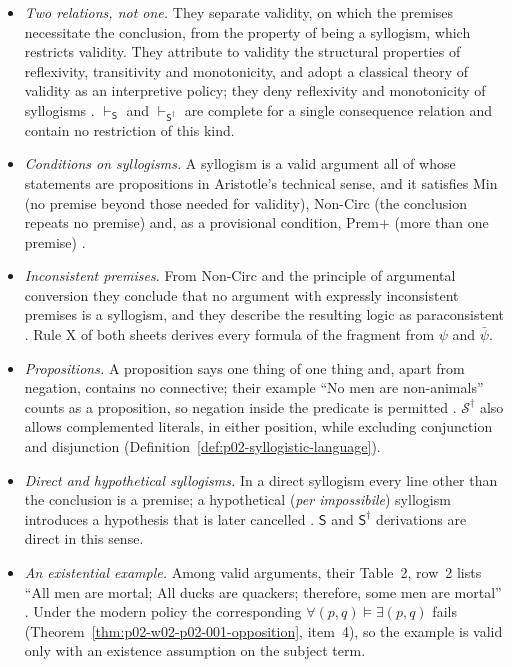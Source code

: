 \begin{itemize}
\item \emph{Two relations, not one.} They separate validity, on which the
 premises necessitate the conclusion, from the property of being a
 syllogism, which restricts validity. They attribute to validity the
 structural properties of reflexivity, transitivity and monotonicity, and
 adopt a classical theory of validity as an interpretive policy; they deny
 reflexivity and monotonicity of syllogisms
 \cite[pp.~49--51, 59]{WoodsIrvine2004EarlyLogic}.
 \(\vdash_{\mathsf S}\) and \(\vdash_{\mathsf S^\dagger}\) are complete
 for a single consequence relation and contain no restriction of this kind.
\item \emph{Conditions on syllogisms.} A syllogism is a valid argument all
 of whose statements are propositions in Aristotle's technical sense, and
 it satisfies Min (no premise beyond those needed for validity), Non-Circ
 (the conclusion repeats no premise) and, as a provisional condition, Prem+
 (more than one premise) \cite[pp.~40, 54--56]{WoodsIrvine2004EarlyLogic}.
\item \emph{Inconsistent premises.} From Non-Circ and the principle of
 argumental conversion they conclude that no argument with expressly
 inconsistent premises is a syllogism, and they describe the resulting
 logic as paraconsistent \cite[pp.~64--65]{WoodsIrvine2004EarlyLogic}.
 Rule X of both sheets derives every formula of the fragment from
 \(\psi\) and \(\bar\psi\).
\item \emph{Propositions.} A proposition says one thing of one thing and,
 apart from negation, contains no connective; their example
 \enquote{No men are non-animals} counts as a proposition, so negation
 inside the predicate is permitted
 \cite[pp.~39--40, 65]{WoodsIrvine2004EarlyLogic}. \(\mathcal S^\dagger\)
 also allows complemented literals, in either position, while excluding
 conjunction and disjunction (Definition~\ref{def:p02-syllogistic-language}).
\item \emph{Direct and hypothetical syllogisms.} In a direct syllogism every
 line other than the conclusion is a premise; a hypothetical
 (\emph{per impossibile}) syllogism introduces a hypothesis that is later
 cancelled \cite[p.~52]{WoodsIrvine2004EarlyLogic}. \(\mathsf S\) and
 \(\mathsf S^\dagger\) derivations are direct in this sense.
\item \emph{An existential example.} Among valid arguments, their
 Table~2, row~2 lists \enquote{All men are mortal; All ducks are quackers;
 therefore, some men are mortal}
 \cite[p.~63]{WoodsIrvine2004EarlyLogic}. Under the modern policy the
 corresponding \(\forall(p,q)\models\exists(p,q)\) fails
 (Theorem~\ref{thm:p02-w02-p02-001-opposition}, item~4), so the example
 is valid only with an existence assumption on the subject term.
\end{itemize}

